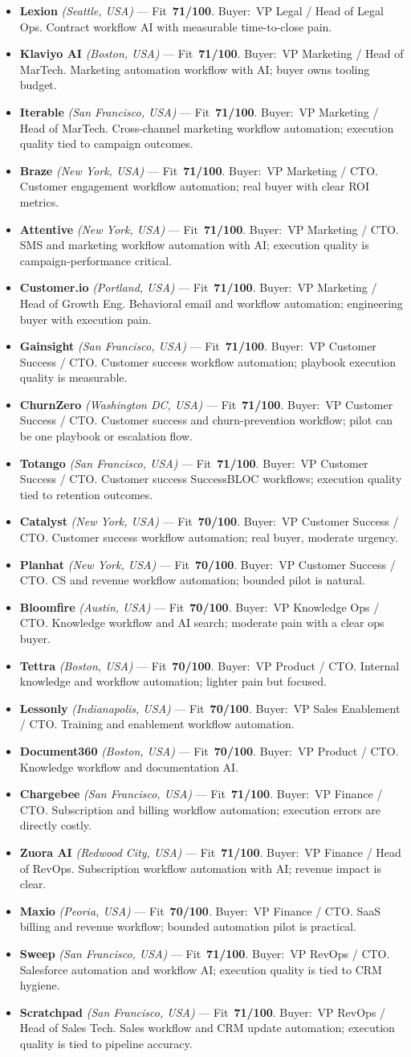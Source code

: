 \documentclass[10pt]{article}
\newcommand{\cand}[5]{\item \textbf{#1} \textit{(#2)} --- Fit~\textbf{#3/100}. Buyer:~#4. #5}
\begin{document}
\begin{itemize}
\cand{Lexion}{Seattle, USA}{71}{VP Legal / Head of Legal Ops}{Contract workflow AI with measurable time-to-close pain.}
\cand{Klaviyo AI}{Boston, USA}{71}{VP Marketing / Head of MarTech}{Marketing automation workflow with AI; buyer owns tooling budget.}
\cand{Iterable}{San Francisco, USA}{71}{VP Marketing / Head of MarTech}{Cross-channel marketing workflow automation; execution quality tied to campaign outcomes.}
\cand{Braze}{New York, USA}{71}{VP Marketing / CTO}{Customer engagement workflow automation; real buyer with clear ROI metrics.}
\cand{Attentive}{New York, USA}{71}{VP Marketing / CTO}{SMS and marketing workflow automation with AI; execution quality is campaign-performance critical.}
\cand{Customer.io}{Portland, USA}{71}{VP Marketing / Head of Growth Eng}{Behavioral email and workflow automation; engineering buyer with execution pain.}
\cand{Gainsight}{San Francisco, USA}{71}{VP Customer Success / CTO}{Customer success workflow automation; playbook execution quality is measurable.}
\cand{ChurnZero}{Washington DC, USA}{71}{VP Customer Success / CTO}{Customer success and churn-prevention workflow; pilot can be one playbook or escalation flow.}
\cand{Totango}{San Francisco, USA}{71}{VP Customer Success / CTO}{Customer success SuccessBLOC workflows; execution quality tied to retention outcomes.}
\cand{Catalyst}{New York, USA}{70}{VP Customer Success / CTO}{Customer success workflow automation; real buyer, moderate urgency.}
\cand{Planhat}{New York, USA}{70}{VP Customer Success / CTO}{CS and revenue workflow automation; bounded pilot is natural.}
\cand{Bloomfire}{Austin, USA}{70}{VP Knowledge Ops / CTO}{Knowledge workflow and AI search; moderate pain with a clear ops buyer.}
\cand{Tettra}{Boston, USA}{70}{VP Product / CTO}{Internal knowledge and workflow automation; lighter pain but focused.}
\cand{Lessonly}{Indianapolis, USA}{70}{VP Sales Enablement / CTO}{Training and enablement workflow automation.}
\cand{Document360}{Boston, USA}{70}{VP Product / CTO}{Knowledge workflow and documentation AI.}
\cand{Chargebee}{San Francisco, USA}{71}{VP Finance / CTO}{Subscription and billing workflow automation; execution errors are directly costly.}
\cand{Zuora AI}{Redwood City, USA}{71}{VP Finance / Head of RevOps}{Subscription workflow automation with AI; revenue impact is clear.}
\cand{Maxio}{Peoria, USA}{70}{VP Finance / CTO}{SaaS billing and revenue workflow; bounded automation pilot is practical.}
\cand{Sweep}{San Francisco, USA}{71}{VP RevOps / CTO}{Salesforce automation and workflow AI; execution quality is tied to CRM hygiene.}
\cand{Scratchpad}{San Francisco, USA}{71}{VP RevOps / Head of Sales Tech}{Sales workflow and CRM update automation; execution quality is tied to pipeline accuracy.}

\end{itemize}
\end{document}
